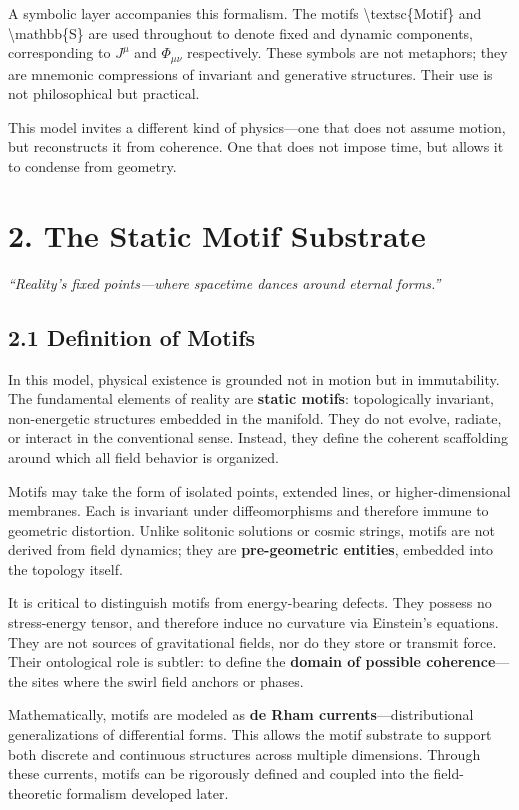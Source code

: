 \documentclass[
  11pt,
]{article}
\begin{document}
A symbolic layer accompanies this formalism. The motifs
\textbackslash textsc\{Motif\} and \textbackslash mathbb\{S\} are used
throughout to denote fixed and dynamic components, corresponding to
\(J^\mu\) and \(\Phi_{\mu\nu}\) respectively. These symbols are not
metaphors; they are mnemonic compressions of invariant and generative
structures. Their use is not philosophical but practical.

This model invites a different kind of physics---one that does not
assume motion, but reconstructs it from coherence. One that does not
impose time, but allows it to condense from geometry.

\section{2. The Static Motif
Substrate}\label{the-static-motif-substrate}

\emph{``Reality's fixed points---where spacetime dances around eternal
forms.''}

\subsection{2.1 Definition of Motifs}\label{definition-of-motifs}

In this model, physical existence is grounded not in motion but in
immutability. The fundamental elements of reality are \textbf{static
motifs}: topologically invariant, non-energetic structures embedded in
the manifold. They do not evolve, radiate, or interact in the
conventional sense. Instead, they define the coherent scaffolding around
which all field behavior is organized.

Motifs may take the form of isolated points, extended lines, or
higher-dimensional membranes. Each is invariant under diffeomorphisms
and therefore immune to geometric distortion. Unlike solitonic solutions
or cosmic strings, motifs are not derived from field dynamics; they are
\textbf{pre-geometric entities}, embedded into the topology itself.

It is critical to distinguish motifs from energy-bearing defects. They
possess no stress-energy tensor, and therefore induce no curvature via
Einstein's equations. They are not sources of gravitational fields, nor
do they store or transmit force. Their ontological role is subtler: to
define the \textbf{domain of possible coherence}---the sites where the
swirl field anchors or phases.

Mathematically, motifs are modeled as \textbf{de Rham
currents}---distributional generalizations of differential forms. This
allows the motif substrate to support both discrete and continuous
structures across multiple dimensions. Through these currents, motifs
can be rigorously defined and coupled into the field-theoretic formalism
developed later.
\end{document}
